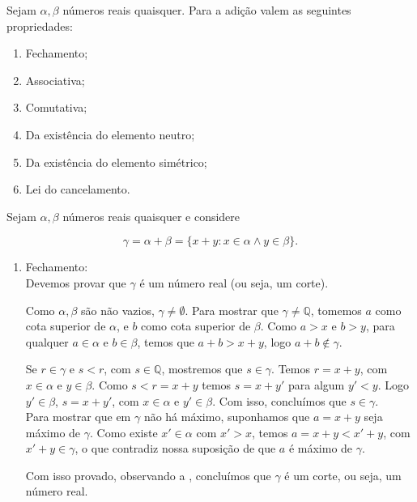 \documentclass[../main.tex]{subfiles}
\begin{document}
\begin{teo}\label{reais-teo-somaPropriedades}{Sejam $\alpha, \beta$ números reais quaisquer. Para a adição valem as seguintes propriedades:}
    \begin{enumerate}[label=(\roman*)]
        \item Fechamento;
        \item Associativa;
        \item Comutativa;
        \item Da existência do elemento neutro; 
        \item Da existência do elemento simétrico;
        \item Lei do cancelamento.
    \end{enumerate}
\end{teo}
\begin{dem}
    Sejam $\alpha, \beta$ números reais quaisquer e considere 
    
    \[ \gamma = \alpha + \beta = \{ x + y : x \in \alpha \land y \in \beta \} . \]
    \begin{enumerate}[label=(\roman*)]
        \item Fechamento: \\
            Devemos provar que $\gamma$ é um número real (ou seja, um corte). 
            
            Como $\alpha, \beta$ são não vazios, $\gamma \neq \emptyset$. Para mostrar que $\gamma \neq \mathbb{Q}$, tomemos $a$ como cota superior de $\alpha$, e $b$ como cota superior de $\beta$. Como $a > x$ e $b > y$, para qualquer $a \in \alpha$ e $b \in \beta$, temos que $a + b > x + y$, logo $a+b \not\in \gamma$. 

            
            Se $r \in \gamma$ e $s < r$, com $s \in \mathbb{Q}$, mostremos que $s \in \gamma$. Temos $r = x + y$, com $x \in \alpha$ e $y \in \beta$.
            Como $s < r = x + y$ temos $s = x + y'$ para algum $y' < y$. Logo $y' \in \beta$, $s = x + y'$, com $x \in \alpha$ e $y' \in \beta$. Com isso, concluímos que $s \in \gamma$. \\

            Para mostrar que em $\gamma$ não há máximo, suponhamos que $a = x + y$ seja máximo de $\gamma$. Como existe $x' \in \alpha$ com $x' > x$, temos $a = x + y < x' + y$, com $x'+y \in \gamma$, o que contradiz nossa suposição de que $a$ é máximo de $\gamma$.

            Com isso provado, observando a , concluímos que $\gamma$ é um corte, ou seja, um número real.
        

\end{enumerate}
\end{dem}
\end{document}
